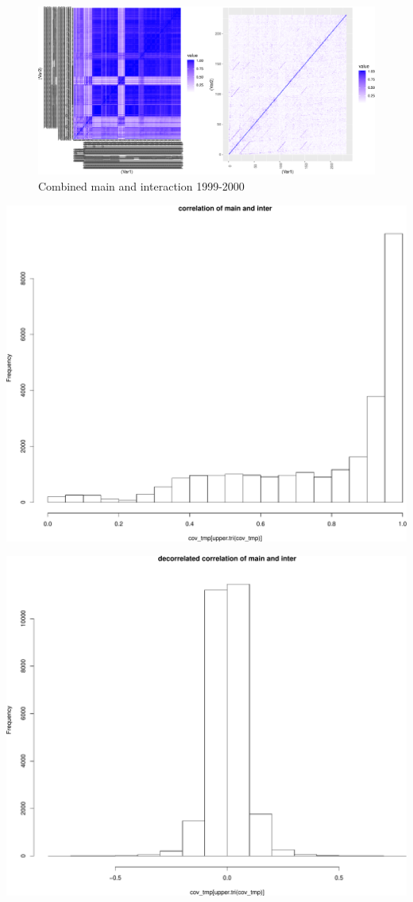 \documentclass[]{article}
\begin{document}
\begin{figure}
\centering
\includegraphics{Low_levels_covariance_files/figure-latex/unnamed-chunk-3-1.pdf}
\caption{Combined main and interaction 1999-2000}
\end{figure}

\includegraphics{Low_levels_covariance_files/figure-latex/unnamed-chunk-4-1.pdf}

\includegraphics{Low_levels_covariance_files/figure-latex/unnamed-chunk-5-1.pdf}
\end{document}
